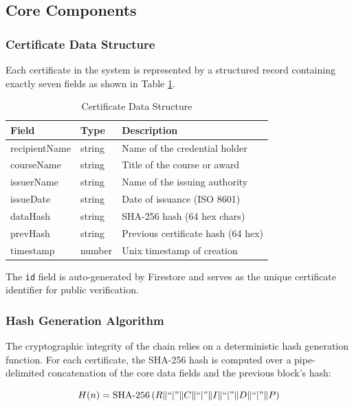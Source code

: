 \documentclass[10pt,twocolumn,a4paper]{article}
\begin{document}
\subsection{Core Components}

\subsubsection{Certificate Data Structure}

Each certificate in the system is represented by a structured record containing exactly seven fields as shown in Table \ref{tab:datastructure}.

\begin{table}[H]
    \centering
    \caption{Certificate Data Structure}
    \label{tab:datastructure}
    \begin{tabular}{@{}llp{4cm}@{}}
        \toprule
        \textbf{Field} & \textbf{Type} & \textbf{Description} \\
        \midrule
        recipientName & string & Name of the credential holder \\
        courseName & string & Title of the course or award \\
        issuerName & string & Name of the issuing authority \\
        issueDate & string & Date of issuance (ISO 8601) \\
        dataHash & string & SHA-256 hash (64 hex chars) \\
        prevHash & string & Previous certificate hash (64 hex) \\
        timestamp & number & Unix timestamp of creation \\
        \bottomrule
    \end{tabular}
\end{table}

The \texttt{id} field is auto-generated by Firestore and serves as the unique certificate identifier for public verification.

\subsubsection{Hash Generation Algorithm}

The cryptographic integrity of the chain relies on a deterministic hash generation function. For each certificate, the SHA-256 hash is computed over a pipe-delimited concatenation of the core data fields and the previous block's hash:

\begin{equation}
    H(n) = \text{SHA-256}\left( R \| ``|" \| C \| ``|" \| I \| ``|" \| D \| ``|" \| P \right)
\end{equation}
\end{document}
